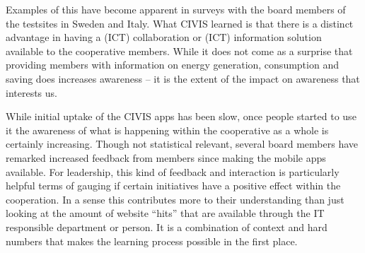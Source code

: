 Examples of this have become apparent in surveys with the board members of the testsites in Sweden and Italy. What CIVIS learned is that there is a distinct advantage in having a (ICT) collaboration or (ICT) information solution available to the cooperative members. While it does not come as a surprise that providing members with information on energy generation, consumption and saving does increases awareness -- it is the extent of the impact on awareness that interests us.

While initial uptake of the CIVIS apps has been slow, once people started to use it the awareness of what is happening within the cooperative as a whole is certainly increasing. Though not statistical relevant, several board members have remarked increased feedback from members since making the mobile apps available. For leadership, this kind of feedback and interaction is particularly helpful terms of gauging if certain initiatives have a positive effect within the cooperation. In a sense this contributes more to their understanding than just looking at the amount of website ``hits'' that are available through the IT responsible department or person. It is a combination of context and hard numbers that makes the learning process possible in the first place. 
